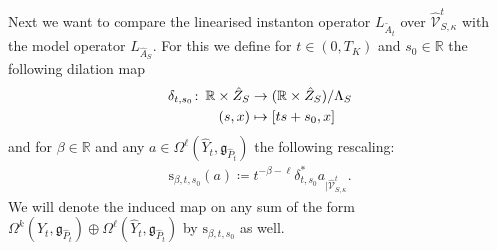 \documentclass[11pt,a4paper]{scrartcl}
\newcommand{\col}{\colon \thinspace}
\numberwithin{equation}{section}
\theoremstyle{plain}
\theoremstyle{definition}
\theoremstyle{remark}
\begin{document}
Next we want to compare the linearised instanton operator $L_{\tilde{A}_t}$ over $\hat{\mathcal{V}}_{S,\kappa}^t$ with the model operator $L_{\hat{A}_S}$. For this we define for $t\in (0,T_K)$ and $s_0\in \mathbb{R}$ the following dilation map
\begin{align*}
\delta_{t,s_0} \col \mathbb{R} \times \hat{Z}_S &\to  (\mathbb{R}\times \hat{Z}_S)/\Lambda_S \\
(s,x) &\mapsto [ts+s_0,x]
\end{align*}
and for $\beta \in \mathbb{R}$ and any $a \in \Omega^{\ell}(\hat{Y}_t,\mathfrak{g}_{\hat{P}_t})$ the following rescaling:
\begin{align}\label{eq:rescaling_ALE}
\mathrm{s}_{\beta,t,s_0}(a) \coloneqq t^{-\beta-\ell} \delta_{t,s_0}^*a_{\vert \hat{\mathcal{V}}_{S,\kappa}^t}.
\end{align}
We will denote the induced map on any sum of the form $\Omega^k(\hat{Y}_t,\mathfrak{g}_{\hat{P}_t})\oplus \Omega^{\ell}(\hat{Y}_t,\mathfrak{g}_{\hat{P}_t})$ by $\mathrm{s}_{\beta,t,s_0}$ as well.
\end{document}
